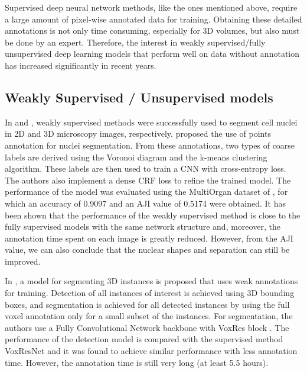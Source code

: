 Supervised deep neural network methods, like the ones mentioned above, require a large amount of pixel-wise annotated data for training. Obtaining these detailed annotations is not only time consuming, especially for \ac{3D} volumes, but also must be done by an expert. Therefore, the interest in weakly supervised/fully unsupervised deep learning models that perform well on data without annotation has increased significantly in recent years.

\subsection{Weakly Supervised / Unsupervised models}

In \cite{weakly:2D} and \cite{weakly:3D}, weakly supervised methods were successfully used to segment cell nuclei in \ac{2D} and \ac{3D} microscopy images, respectively. \citet{weakly:2D} proposed the use of points annotation for nuclei segmentation. From these annotations, two types of coarse labels are derived using the Voronoi diagram and the k-means clustering algorithm. These labels are then used to train a \ac{CNN} with cross-entropy loss. The authors also implement a dense CRF loss to refine the trained model. The performance of the model was evaluated using the MultiOrgan dataset of \cite{CNN3}, for which an accuracy of 0.9097 and an \ac{AJI} value of 0.5174 were obtained. It has been shown that the performance of the weakly supervised method is close to the fully supervised models with the same network structure and, moreover, the annotation time spent on each image is greatly reduced. However, from the \ac{AJI} value, we can also conclude that the nuclear shapes and separation can still be improved.

In \cite{weakly:3D}, a model for segmenting \ac{3D} instances is proposed that uses weak annotations for training. Detection of all instances of interest is achieved using \ac{3D} bounding boxes, and segmentation is achieved for all detected instances by using the full voxel annotation only for a small subset of the instances. For segmentation, the authors use a Fully Convolutional Network backbone with VoxRes block \cite{voxresnet}. The performance of the detection model is compared with the supervised method VoxResNet \cite{voxresnet} and it was found to achieve similar performance with less annotation time. However, the annotation time is still very long (at least 5.5 hours).

